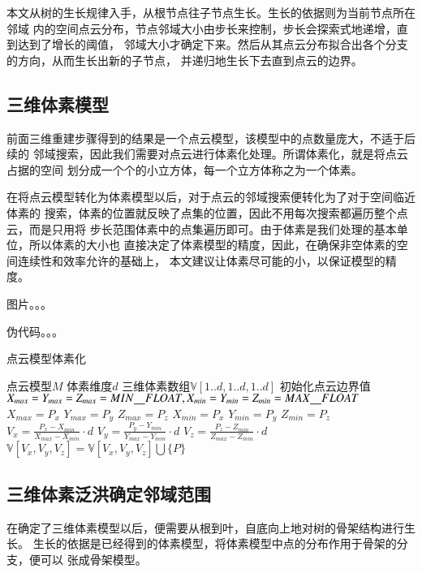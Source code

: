 本文从树的生长规律入手，从根节点往子节点生长。生长的依据则为当前节点所在邻域
内的空间点云分布，节点邻域大小由步长来控制，步长会探索式地递增，直到达到了增长的阈值，
邻域大小才确定下来。然后从其点云分布拟合出各个分支的方向，从而生长出新的子节点，
并递归地生长下去直到点云的边界。

\subsection{三维体素模型}
前面三维重建步骤得到的结果是一个点云模型，该模型中的点数量庞大，不适于后续的
邻域搜索，因此我们需要对点云进行体素化处理。所谓体素化，就是将点云占据的空间
划分成一个个的小立方体，每一个立方体称之为一个体素。

在将点云模型转化为体素模型以后，对于点云的邻域搜索便转化为了对于空间临近体素的
搜索，体素的位置就反映了点集的位置，因此不用每次搜索都遍历整个点云，而是只用将
步长范围体素中的点集遍历即可。由于体素是我们处理的基本单位，所以体素的大小也
直接决定了体素模型的精度，因此，在确保非空体素的空间连续性和效率允许的基础上，
本文建议让体素尽可能的小，以保证模型的精度。

图片。。。

伪代码。。。
\begin{algorithm}
	\caption{点云模型体素化}
\begin{algorithmic}[1]
	\Require 点云模型$M$
	\Require 体素维度$d$
	\Ensure 三维体素数组$\mathbb{V}[1..d,1..d,1..d]$
	\State 初始化点云边界值$X_{max}=Y_{max}=Z_{max}=MIN\uline\quad FLOAT,X_{min}=Y_{min}=Z_{min}=MAX\uline\quad FLOAT$
	\State $X_{max}=P_x$
\EndIf
{}
\State $Y_{max}=P_y$
		\EndIf
		\State $Z_{max}=P_z$
	\EndIf
	\State $X_{min}=P_x$
\EndIf
{}
\State $Y_{min}=P_y$
		\EndIf
		\State $Z_{min}=P_z$
	\EndIf
\EndFor
{}
\State $V_x = \frac{P_x-X_{min}}{X_{max}-X_{min}}\cdot d$
\State $V_y = \frac{P_y-Y_{min}}{Y_{max}-Y_{min}}\cdot d$
\State $V_z = \frac{P_z-Z_{min}}{Z_{max}-Z_{min}}\cdot d$
\State $\mathbb{V}[V_x, V_y, V_z] = \mathbb{V}[V_x, V_y, V_z] \bigcup \{P\} $
	\EndFor
\end{algorithmic}
\end{algorithm}

\subsection{三维体素泛洪确定邻域范围}
在确定了三维体素模型以后，便需要从根到叶，自底向上地对树的骨架结构进行生长。
生长的依据是已经得到的体素模型，将体素模型中点的分布作用于骨架的分支，便可以
张成骨架模型。

